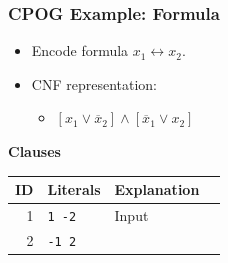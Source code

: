 \documentclass[t,pdf]{beamer}
\newcommand{\opos}[1]{#1}
\newcommand{\oneg}[1]{\overline{#1}}
\newcommand{\rtext}[1]{\textcolor{xred}{#1}}
\newcommand{\gtext}[1]{\textcolor{xgreen}{#1}}
\begin{document}
\begin{frame}
  \frametitle{CPOG Example: Formula}

\bigskip

\begin{minipage}{0.58\textwidth}
  \begin{itemize}
  \item Encode formula $x_1 \leftrightarrow x_2$.
  \item CNF representation:\\[.3em]
    \begin{itemize}
      \item[] $[\opos{x}_1 \lor \oneg{x}_2] \land [\oneg{x}_1 \lor \opos{x}_2]$
    \end{itemize}
  \end{itemize}
\end{minipage}
\begin{minipage}{0.4\textwidth}
{\bf Clauses}\\[0.5em]
\begin{tabular}{rlll}
\toprule
  ID & Literals & Explanation\\
\midrule
  \rtext{1} & \gtext{\texttt{1 -2}} & Input  \\
  \rtext{2} & \gtext{\texttt{-1 2}} &   \\
\bottomrule
\end{tabular}
\end{minipage}
\end{frame}
\end{document}
